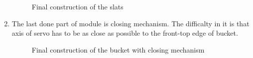 \begin{enumerate}
\begin{figure}[h]
\begin{minipage}[h]{0.47\linewidth}
  		\caption{Final construction of the slats}
  	\end{minipage}
  \end{figure}
  \item The last done part of module is closing mechanism. The difficalty in it is that axis of servo has to be as close as possible to the front-top edge of bucket.
  
  \begin{figure}[h]
  	\begin{minipage}[h]{1\linewidth}
  		\caption{Final construction of the bucket with closing mechanism}
  	\end{minipage}
  \end{figure}
  
  \end{enumerate}	